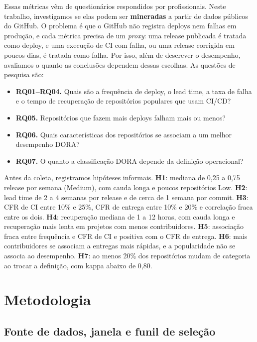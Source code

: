 \documentclass[12pt]{article}
\begin{document}
Essas métricas vêm de questionários respondidos por profissionais. Neste trabalho,
investigamos se elas podem ser \textbf{mineradas} a partir de dados públicos do GitHub.
O problema é que o GitHub não registra deploys nem falhas em produção, e cada métrica
precisa de um \textit{proxy}: uma release publicada é tratada como deploy, e uma
execução de CI com falha, ou uma release corrigida em poucos dias, é tratada como
falha. Por isso, além de descrever o desempenho, avaliamos o quanto as conclusões
dependem dessas escolhas. As questões de pesquisa são:

\begin{itemize}
\item \textbf{RQ01--RQ04.} Quais são a frequência de deploy, o lead time, a taxa de
falha e o tempo de recuperação de repositórios populares que usam CI/CD?
\item \textbf{RQ05.} Repositórios que fazem mais deploys falham mais ou menos?
\item \textbf{RQ06.} Quais características dos repositórios se associam a um melhor
desempenho DORA?
\item \textbf{RQ07.} O quanto a classificação DORA depende da definição operacional?
\end{itemize}

Antes da coleta, registramos hipóteses informais. \textbf{H1}: mediana de 0,25 a 0,75
release por semana (Medium), com cauda longa e poucos repositórios Low. \textbf{H2}:
lead time de 2 a 4 semanas por release e de cerca de 1 semana por commit.
\textbf{H3}: CFR de CI entre 10\% e 25\%, CFR de entrega entre 10\% e 20\% e
correlação fraca entre os dois. \textbf{H4}: recuperação mediana de 1 a 12 horas,
com cauda longa e recuperação mais lenta em projetos com menos contribuidores.
\textbf{H5}: associação fraca entre frequência e CFR de CI e positiva com o CFR de
entrega. \textbf{H6}: mais contribuidores se associam a entregas mais rápidas, e a
popularidade não se associa ao desempenho. \textbf{H7}: ao menos 20\% dos
repositórios mudam de categoria ao trocar a definição, com kappa abaixo de 0,80.

\section{Metodologia}

\subsection{Fonte de dados, janela e funil de seleção}
\end{document}

